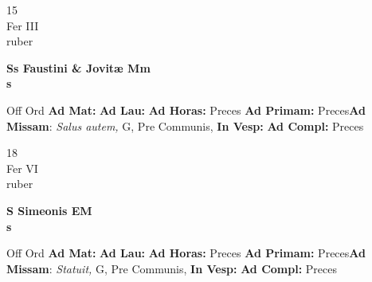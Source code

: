 \documentclass[10pt, openany]{book}
\begin{document}
    \begin{center}
        \begin{minipage}{3.5in}
            \vspace{2em}
            \begin{minipage}{0.5in}
                {\Huge 15} \\
                {\normalsize Fer III} \\
                {\normalsize ruber}
            \end{minipage}
            \begin{minipage}{3.0in}
                \textbf{ \large Ss Faustini \& Jovitæ Mm \\
                \textnormal{\normalsize s}} \\ 
            \end{minipage}
            \begin{justify}Off Ord
                \textbf{Ad Mat: }
                \textbf{Ad Lau: }
                \textbf{Ad Horas: }Preces
                \textbf{Ad Primam: }Preces\textbf{Ad Missam}: \textit{Salus autem,} G, Pre Communis,  
                \textbf{In Vesp: }
                \textbf{Ad Compl: }Preces
            \end{justify}
        \end{minipage}
    \end{center}

    \begin{center}
        \begin{minipage}{3.5in}
            \vspace{2em}
            \begin{minipage}{0.5in}
                {\Huge 18} \\
                {\normalsize Fer VI} \\
                {\normalsize ruber}
            \end{minipage}
            \begin{minipage}{3.0in}
                \textbf{ \large S Simeonis EM \\
                \textnormal{\normalsize s}} \\ 
            \end{minipage}
            \begin{justify}Off Ord
                \textbf{Ad Mat: }
                \textbf{Ad Lau: }
                \textbf{Ad Horas: }Preces
                \textbf{Ad Primam: }Preces\textbf{Ad Missam}: \textit{Statuit,} G, Pre Communis,  
                \textbf{In Vesp: }
                \textbf{Ad Compl: }Preces
            \end{justify}
        \end{minipage}
    \end{center}
\end{document}
